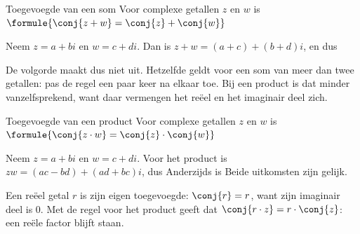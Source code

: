 \begin{theorie}
\begin{stelling}{Toegevoegde van een som}
Voor complexe getallen $z$ en $w$ is \quad $\formule{\conj{z + w} = \conj{z} + \conj{w}}$
\end{stelling}

\begin{bewijs}
Neem $z = a + bi$ en $w = c + di$. Dan is $z + w = (a + c) + (b + d)i$, en dus
\end{bewijs}
\end{theorie}

De volgorde maakt dus niet uit. Hetzelfde geldt voor een som van meer dan twee getallen: pas de regel een paar keer na elkaar toe. Bij een product is dat minder vanzelfsprekend, want daar vermengen het reëel en het imaginair deel zich.

\begin{theorie}
\begin{stelling}{Toegevoegde van een product}
Voor complexe getallen $z$ en $w$ is \quad $\formule{\conj{z \cdot w} = \conj{z} \cdot \conj{w}}$
\end{stelling}

\begin{bewijs}
Neem $z = a + bi$ en $w = c + di$. Voor het product is $zw = (ac - bd) + (ad + bc)i$, dus
Anderzijds is
Beide uitkomsten zijn gelijk.
\end{bewijs}
\end{theorie}

Een reëel getal $r$ is zijn eigen toegevoegde: $\conj{r} = r$, want zijn imaginair deel is 0. Met de regel voor het product geeft dat $\conj{r \cdot z} = r \cdot \conj{z}$: een reële factor blijft staan.


